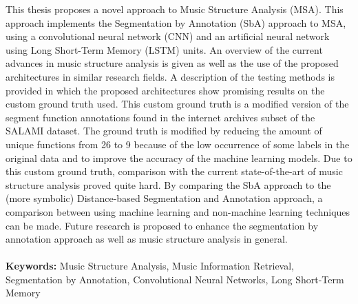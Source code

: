 This thesis proposes a novel approach to Music Structure Analysis (MSA). This approach implements the Segmentation by Annotation (SbA) approach to MSA, using a convolutional neural network (CNN) and an artificial neural network using Long Short-Term Memory (LSTM) units. An overview of the current advances in music structure analysis is given as well as the use of the proposed architectures in similar research fields. A description of the testing methods is provided in which the proposed architectures show promising results on the custom ground truth used. This custom ground truth is a modified version of the segment function annotations found in the internet archives subset of the SALAMI dataset. The ground truth is modified by reducing the amount of unique functions from 26 to 9 because of the low occurrence of some labels in the original data and to improve the accuracy of the machine learning models. Due to this custom ground truth, comparison with the current state-of-the-art of music structure analysis proved quite hard. By comparing the SbA approach to the (more symbolic) Distance-based Segmentation and Annotation approach, a comparison between using machine learning and non-machine learning techniques can be made. Future research is proposed to enhance the segmentation by annotation approach as well as music structure analysis in general.\\
\\
\textbf{Keywords:} Music Structure Analysis, Music Information Retrieval, Segmentation by Annotation, Convolutional Neural Networks, Long Short-Term Memory